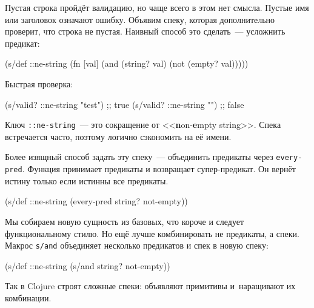 Пустая строка пройдёт валидацию, но чаще всего в этом нет смысла. Пустые имя или
заголовок означают ошибку. Объявим спеку, которая дополнительно проверит, что
строка не пустая. Наивный способ это сделать~--- усложнить предикат:


\begin{english}
  \begin{clojure}
(s/def ::ne-string
  (fn [val]
    (and (string? val)
         (not (empty? val)))))
  \end{clojure}
\end{english}

\noindent
Быстрая проверка:

\begin{english}
  \begin{clojure}
(s/valid? ::ne-string "test") ;; true
(s/valid? ::ne-string "")     ;; false
  \end{clojure}
\end{english}

Ключ \verb|::ne-string|~--- это сокращение от <<\textbf{n}on-\textbf{e}mpty
string>>. Спека встречается часто, поэтому логично сэкономить на её имени.

Более изящный способ задать эту спеку~--- объединить предикаты через
\verb|every-pred|. Функция принимает предикаты и возвращает супер-предикат. Он
вернёт истину только если истинны все предикаты.

\begin{english}
  \begin{clojure}
(s/def ::ne-string
  (every-pred string? not-empty))
  \end{clojure}
\end{english}


Мы собираем новую сущность из базовых, что короче и следует функциональному
стилю. Но ещё лучше комбинировать не предикаты, а спеки. Макрос \verb|s/and|
объединяет несколько предикатов и спек в новую спеку:

\begin{english}
  \begin{clojure}
(s/def ::ne-string
  (s/and string? not-empty))
  \end{clojure}
\end{english}

Так в Clojure строят сложные спеки: объявляют примитивы и~наращивают их
комбинации.

